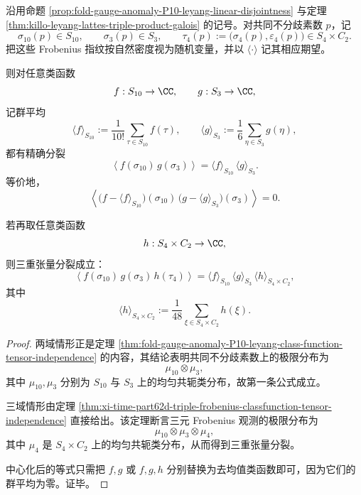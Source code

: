 \begin{theorem}\label{thm:xi-time-part9zg-frobenius-classfunction-tensor-factorization}
沿用命题 \ref{prop:fold-gauge-anomaly-P10-leyang-linear-disjointness} 与定理 \ref{thm:killo-leyang-lattes-triple-product-galois} 的记号。对共同不分歧素数 \(p\)，记
\[
\sigma_{10}(p)\in S_{10},
\qquad
\sigma_3(p)\in S_3,
\qquad
\tau_4(p):=\bigl(\sigma_4(p),\varepsilon_4(p)\bigr)\in S_4\times C_2.
\]
把这些 Frobenius 指纹按自然密度视为随机变量，并以 \(\langle\cdot\rangle\) 记其相应期望。

则对任意类函数
\[
f:S_{10}\to\CC,
\qquad
g:S_3\to\CC,
\]
记群平均
\[
\langle f\rangle_{S_{10}}:=\frac{1}{10!}\sum_{\tau\in S_{10}}f(\tau),
\qquad
\langle g\rangle_{S_3}:=\frac{1}{6}\sum_{\eta\in S_3}g(\eta),
\]
都有精确分裂
\[
\left\langle f(\sigma_{10})\,g(\sigma_3)\right\rangle
=
\langle f\rangle_{S_{10}}\,
\langle g\rangle_{S_3}.
\]
等价地，
\[
\left\langle
\bigl(f-\langle f\rangle_{S_{10}}\bigr)(\sigma_{10})\,
\bigl(g-\langle g\rangle_{S_3}\bigr)(\sigma_3)
\right\rangle
=0.
\]

若再取任意类函数
\[
h:S_4\times C_2\to\CC,
\]
则三重张量分裂成立：
\[
\left\langle
f(\sigma_{10})\,g(\sigma_3)\,h(\tau_4)
\right\rangle
=
\langle f\rangle_{S_{10}}\,
\langle g\rangle_{S_3}\,
\langle h\rangle_{S_4\times C_2},
\]
其中
\[
\langle h\rangle_{S_4\times C_2}:=
\frac{1}{48}\sum_{\xi\in S_4\times C_2}h(\xi).
\]
\end{theorem}
\begin{proof}
两域情形正是定理 \ref{thm:fold-gauge-anomaly-P10-leyang-class-function-tensor-independence} 的内容，其结论表明共同不分歧素数上的极限分布为
\[
\mu_{10}\otimes \mu_3,
\]
其中 \(\mu_{10},\mu_3\) 分别为 \(S_{10}\) 与 \(S_3\) 上的均匀共轭类分布，故第一条公式成立。

三域情形由定理 \ref{thm:xi-time-part62d-triple-frobenius-classfunction-tensor-independence} 直接给出。该定理断言三元 Frobenius 观测的极限分布为
\[
\mu_{10}\otimes \mu_3\otimes \mu_4,
\]
其中 \(\mu_4\) 是 \(S_4\times C_2\) 上的均匀共轭类分布，从而得到三重张量分裂。

中心化后的等式只需把 \(f,g\) 或 \(f,g,h\) 分别替换为去均值类函数即可，因为它们的群平均为零。证毕。
\end{proof}

